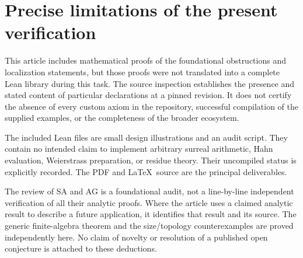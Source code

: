 \documentclass[11pt,letterpaper]{article}
\theoremstyle{definition}
\theoremstyle{remark}
\numberwithin{equation}{section}
\begin{document}
\section{Precise limitations of the present verification}\label{app:limitations}
This article includes mathematical proofs of the foundational obstructions and localization statements, but those proofs were not translated into a complete Lean library during this task. The source inspection establishes the presence and stated content of particular declarations at a pinned revision. It does not certify the absence of every custom axiom in the repository, successful compilation of the supplied examples, or the completeness of the broader ecosystem.

The included Lean files are small design illustrations and an audit script. They contain no intended claim to implement arbitrary surreal arithmetic, Hahn evaluation, Weierstrass preparation, or residue theory. Their uncompiled status is explicitly recorded. The PDF and \LaTeX\ source are the principal deliverables.

The review of SA and AG is a foundational audit, not a line-by-line independent verification of all their analytic proofs. Where the article uses a claimed analytic result to describe a future application, it identifies that result and its source. The generic finite-algebra theorem and the size/topology counterexamples are proved independently here. No claim of novelty or resolution of a published open conjecture is attached to these deductions.

\end{document}

